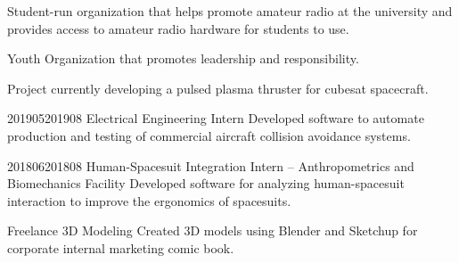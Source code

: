 \documentclass[letterpaper,ddMMMyyyy,nonstopmode]{simpleresumecv}
\begin{document}
\begin{Body}
                {Student-run organization that helps promote amateur
                    radio at the university and provides access to amateur
                    radio hardware for students to use.
                    }

            \Gap

                {Youth Organization that promotes leadership and responsibility.
                }



            {Project currently developing a pulsed plasma thruster
                for cubesat spacecraft.}


                {2019}{05}{2019}{08}
                {Electrical Engineering Intern}
                {Developed software to automate production and testing of commercial aircraft
                    collision avoidance systems.}
            \Gap



                {2018}{06}{2018}{08}
                {Human-Spacesuit Integration Intern -- Anthropometrics and Biomechanics Facility}
                {Developed software for analyzing human-spacesuit interaction to improve the ergonomics
                    of spacesuits.}

            \Gap

                {Freelance 3D Modeling}
                {Created 3D models using Blender and Sketchup for corporate
                    internal marketing comic book.}



		\Gap
            \begin{skillTable}
                \\


\end{skillTable}
\end{Body}
\end{document}
